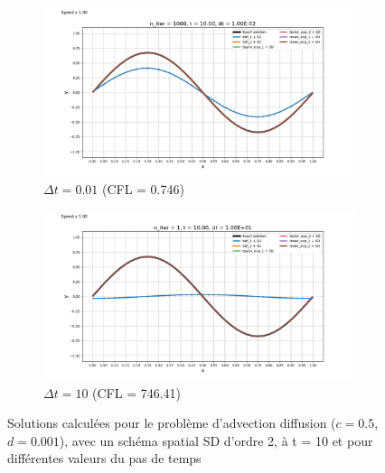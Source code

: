     \begin{figure}
        \centering
        \begin{subfigure}{.5\textwidth}
            \centering
            \includegraphics[width=\textwidth]{images/results/edp_adv_diff_cfl_1.png}
            \caption{$\Delta t = 0.01$ (CFL = 0.746)}
        \label{fig:edp_adv_diff_cfl_1}
        \end{subfigure}%
        \begin{subfigure}{.5\textwidth}
            \centering
            \includegraphics[width=\textwidth]{images/results/edp_adv_diff_cfl_2.png}
            \caption{$\Delta t = 10$ (CFL = 746.41)}
        \label{fig:edp_adv_diff_cfl_2}
        \end{subfigure}
        \caption{Solutions calculées pour le problème d'advection diffusion ($c = 0.5$, $d = 0.001$), avec un schéma spatial SD d'ordre 2, à t = 10 et pour différentes valeurs du pas de temps}
    \label{fig:edp_adv_diff_cfl}
    \end{figure}
